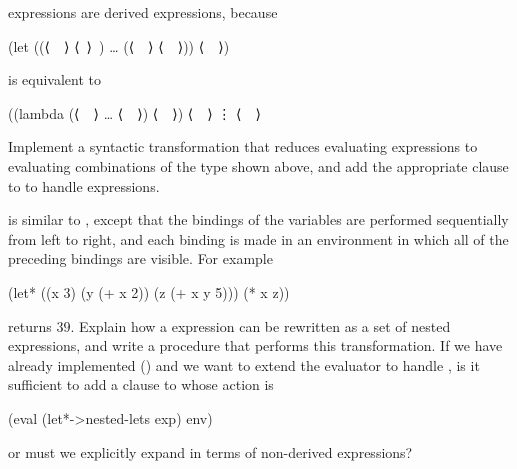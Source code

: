 \begin{exercise}
	\label{Exercise 4.6}
	 expressions are derived expressions, because
	\begin{scheme}
	  (let ((⟨~~⟩ ⟨~⟩~) … (⟨~~⟩ ⟨~~⟩))
	    ⟨~~⟩)
	\end{scheme}
	is equivalent to
	\begin{scheme}
	  ((lambda (⟨~~⟩ … ⟨~~⟩)
	     ⟨~~⟩)
	     ⟨~~⟩
	     ⋮
	     ⟨~~⟩
	\end{scheme}
	Implement a syntactic transformation  that reduces evaluating  expressions to evaluating combinations of the type shown above, and add the appropriate clause to  to handle \code{let}
	expressions.
\end{exercise}



\begin{exercise}
	\label{Exercise 4.7}
	 is similar to , except that the bindings of the  variables are performed sequentially from left to right, and each binding is made in an environment in which all of the preceding bindings are visible.
	For example
	\begin{scheme}
	  (let* ((x 3)  (y (+ x 2))  (z (+ x y 5)))
	    (* x z))
	\end{scheme}
	returns \( 39 \).
	Explain how a  expression can be rewritten as a set of nested  expressions, and write a procedure  that performs this transformation.
	If we have already implemented  () and we want to extend the evaluator to handle , is it sufficient to add a clause to  whose action is
	\begin{scheme}
	  (eval (let*->nested-lets exp) env)
	\end{scheme}
	or must we explicitly expand  in terms of non-derived expressions?
\end{exercise}




